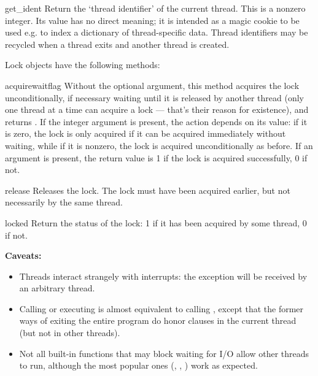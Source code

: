 \begin{funcdesc}{get_ident}{}
Return the `thread identifier' of the current thread.  This is a
nonzero integer.  Its value has no direct meaning; it is intended as a
magic cookie to be used e.g. to index a dictionary of thread-specific
data.  Thread identifiers may be recycled when a thread exits and
another thread is created.
\end{funcdesc}

Lock objects have the following methods:

\renewcommand{\indexsubitem}{(lock method)}
\begin{funcdesc}{acquire}{waitflag}
Without the optional argument, this method acquires the lock
unconditionally, if necessary waiting until it is released by another
thread (only one thread at a time can acquire a lock --- that's their
reason for existence), and returns .  If the integer
 argument is present, the action depends on its value:
if it is zero, the lock is only acquired if it can be acquired
immediately without waiting, while if it is nonzero, the lock is
acquired unconditionally as before.  If an argument is present, the
return value is 1 if the lock is acquired successfully, 0 if not.
\end{funcdesc}

\begin{funcdesc}{release}{}
Releases the lock.  The lock must have been acquired earlier, but not
necessarily by the same thread.
\end{funcdesc}

\begin{funcdesc}{locked}{}
Return the status of the lock: 1 if it has been acquired by some
thread, 0 if not.
\end{funcdesc}

{\bf Caveats:}

\begin{itemize}
\item
Threads interact strangely with interrupts: the
 exception will be received by an arbitrary
thread.

\item
Calling  or executing
 is almost equivalent to calling
, except that the former ways of
exiting the entire program do honor  clauses in the
current thread (but not in other threads).

\item
Not all built-in functions that may block waiting for I/O allow other
threads to run, although the most popular ones (,
, ) work as expected.

\end{itemize}
